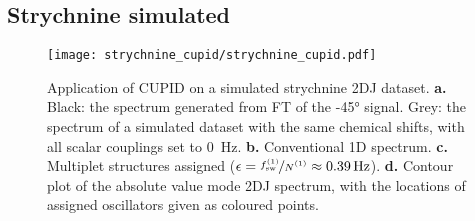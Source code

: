 
\subsection{Strychnine simulated}
\label{subsec:strychnine-cupid}
\begin{figure}
    \centering
    \texttt{[image: strychnine\_cupid/strychnine\_cupid.pdf]}
    \caption[
        Application of \acs{CUPID} on a simulated strychnine \acs{2DJ} dataset.
    ]
    {
        Application of \ac{CUPID} on a simulated strychnine \ac{2DJ} dataset.
        \textbf{a.} Black: the spectrum generated from \ac{FT} of the \ang{-45}
        signal. Grey: the spectrum of a simulated dataset with the same
        chemical shifts, with all scalar couplings set to \qty{0}{\hertz}.
        \textbf{b.} Conventional \ac{1D} spectrum.
        \textbf{c.} Multiplet structures assigned ($\epsilon =
        \nicefrac{\fswone}{\None} \approx \qty{0.39}{\hertz}$).
        \textbf{d.} Contour plot of the absolute value mode \ac{2DJ} spectrum,
        with the locations of assigned oscillators given as coloured points.
    }
    \label{fig:strychnine-cupid}
\end{figure}

